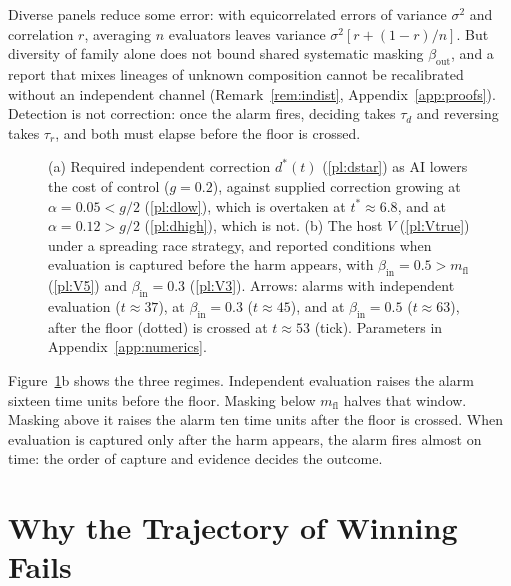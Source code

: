 \documentclass[letterpaper]{article} %
\theoremstyle{definition}
\newcommand{\mfl}{m_{\mathrm{fl}}}
\begin{document}
Diverse panels reduce some error: with equicorrelated errors of variance $\sigma^2$ and correlation $r$, averaging $n$ evaluators leaves variance $\sigma^2[r+(1-r)/n]$. But diversity of family alone does not bound shared systematic masking $\beta_{\mathrm{out}}$, and a report that mixes lineages of unknown composition cannot be recalibrated without an independent channel (Remark~\ref{rem:indist}, Appendix~\ref{app:proofs}). Detection is not correction: once the alarm fires, deciding takes $\tau_d$ and reversing takes $\tau_r$, and both must elapse before the floor is crossed.

\begin{figure}[t]
\centering

\caption{(a) Required independent correction $d^\ast(t)$ (\ref{pl:dstar}) as AI lowers the cost of control ($g=0.2$), against supplied correction growing at $\alpha=0.05<g/2$ (\ref{pl:dlow}), which is overtaken at $t^\ast\approx6.8$, and at $\alpha=0.12>g/2$ (\ref{pl:dhigh}), which is not. (b) The host $V$ (\ref{pl:Vtrue}) under a spreading race strategy, and reported conditions when evaluation is captured before the harm appears, with $\beta_{\mathrm{in}}=0.5>\mfl$ (\ref{pl:V5}) and $\beta_{\mathrm{in}}=0.3$ (\ref{pl:V3}). Arrows: alarms with independent evaluation ($t\approx37$), at $\beta_{\mathrm{in}}=0.3$ ($t\approx45$), and at $\beta_{\mathrm{in}}=0.5$ ($t\approx63$), after the floor (dotted) is crossed at $t\approx53$ (tick). Parameters in Appendix~\ref{app:numerics}.}
\label{fig:rate}
\end{figure}

Figure~\ref{fig:rate}b shows the three regimes. Independent evaluation raises the alarm sixteen time units before the floor. Masking below $\mfl$ halves that window. Masking above it raises the alarm ten time units after the floor is crossed. When evaluation is captured only after the harm appears, the alarm fires almost on time: the order of capture and evidence decides the outcome.

\section{Why the Trajectory of Winning Fails}\label{sec:fail}
\end{document}

